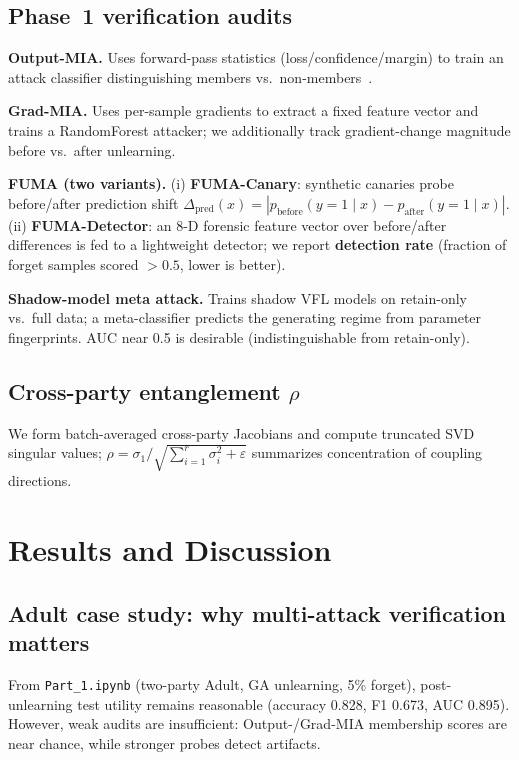 \documentclass[sigconf,nonacm]{acmart}
\begin{document}
\subsection{Phase~1 verification audits}
\textbf{Output-MIA.} Uses forward-pass statistics (loss/confidence/margin) to train an attack classifier distinguishing members vs.\ non-members~\cite{shokri2017mia}.

\textbf{Grad-MIA.} Uses per-sample gradients to extract a fixed feature vector and trains a RandomForest attacker; we additionally track gradient-change magnitude before vs.\ after unlearning.

\textbf{FUMA (two variants).} (i) \textbf{FUMA-Canary}: synthetic canaries probe before/after prediction shift $\Delta_{\mathrm{pred}}(x)=|p_{\mathrm{before}}(y{=}1\mid x)-p_{\mathrm{after}}(y{=}1\mid x)|$. (ii) \textbf{FUMA-Detector}: an 8-D forensic feature vector over before/after differences is fed to a lightweight detector; we report \textbf{detection rate} (fraction of forget samples scored $>0.5$, lower is better).

\textbf{Shadow-model meta attack.} Trains shadow VFL models on retain-only vs.\ full data; a meta-classifier predicts the generating regime from parameter fingerprints. AUC near 0.5 is desirable (indistinguishable from retain-only).

\subsection{Cross-party entanglement $\rho$}
We form batch-averaged cross-party Jacobians and compute truncated SVD singular values; $\rho=\sigma_1/\sqrt{\sum_{i=1}^{r}\sigma_i^2+\varepsilon}$ summarizes concentration of coupling directions.

\section{Results and Discussion}
\subsection{Adult case study: why multi-attack verification matters}
From \texttt{Part\_1.ipynb} (two-party Adult, GA unlearning, 5\% forget), post-unlearning test utility remains reasonable (accuracy 0.828, F1 0.673, AUC 0.895). However, weak audits are insufficient: Output-/Grad-MIA membership scores are near chance, while stronger probes detect artifacts.
\end{document}
